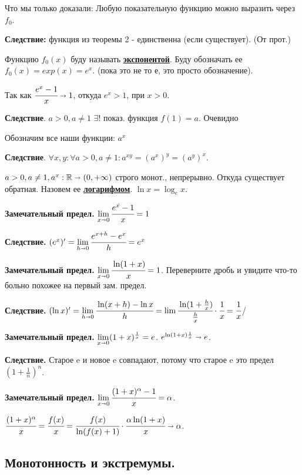 \documentclass{article}
\newcommand{\deff}[1]{\underline{\textbf{#1}}}
\begin{document}
Что мы только доказали: Любую показательную функцию можно выразить через $f_0$.

\textbf{Следствие:} функция из теоремы 2 - единственна (если существует). (От прот.)

Функцию $f_0(x)$ буду называть \deff{экспонентой}. Буду обозначать ее $f_0(x) = exp(x) = e^x$. (пока это не то е, это просто обозначение). 

Так как $\cfrac{e^x - 1}{x}\shortrightarrow 1$, откуда $e^x >1$, при $x>0$.

\textbf{Следствие}. $a>0, a\neq 1$ $\exists! $ показ. функция $f(1) = a$. Очевидно

Обозначим все наши функции: $a^x$

\textbf{Следствие}. $\forall x,y: \forall a>0, a \neq 1: a^{xy} = (a^x)^y  = (a^y)^x$. 

$a>0,a \neq 1, a^x: \mathbb{R} \shortrightarrow (0, +\infty)$ строго монот., непрерывно. Откуда существует обратная. Назовем ее \deff{логарифмом}. $\ln x = \log_e x$.

\textbf{Замечательный предел.} $\lim\limits_{x \shortrightarrow 0} \cfrac{e^x-1}{x}=1$

\textbf{Следствие.} $(e^x)' = \lim\limits_{h\shortrightarrow 0} \cfrac{e^{x+h}-e^x}{h}=e^x$

\textbf{Замечательный предел.} $\lim\limits_{x\shortrightarrow 0} \cfrac{\ln(1+x)}{x}=1 $. Переверните дробь и увидите что-то больно похожее на первый зам. предел.

\textbf{Следствие.} $(\ln x)' = \lim \limits_{h \shortrightarrow 0} \cfrac{\ln(x+h)-\ln x}{h} = \lim \cfrac{\ln(1+ \frac{h}{x})}{\frac{h}{x}}\cdot \cfrac{1}{x} = \cfrac{1}{x}$/

\textbf{Замечательный предел.} $\lim\limits_{x\shortrightarrow 0} (1+x)^{\frac{1}{x}}=e$. $e^{\ln (1+x) \frac{1}{x}}\shortrightarrow e$.

\textbf{Следствие.}  Старое e и новое e совпадают, потому что старое e это предел $(1+\frac{1}{n})^n$.

\textbf{Замечательный предел.} $\lim\limits_{x\shortrightarrow 0} \cfrac{(1+x)^\alpha-1}{x} = \alpha$.

$\cfrac{(1+x)^\alpha}{x}=\cfrac{f(x)}{x}=\cfrac{f(x)}{\ln(f(x)+1)} \cdot \cfrac{\alpha \ln(1+x)}{x}\shortrightarrow \alpha$.
\pagebreak


\subsection{Монотонность и экстремумы.}
\end{document}
